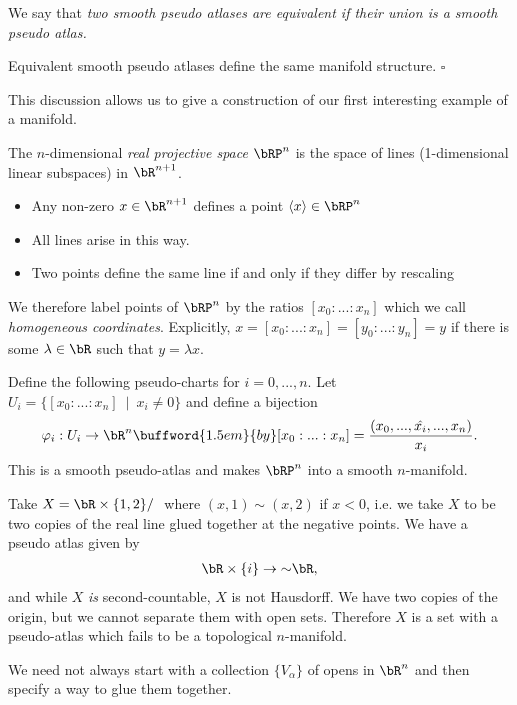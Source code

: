 We say that \emph{two smooth pseudo atlases are equivalent if their union is a smooth pseudo atlas.}
\begin{lem}\label{lem:equiv-pseudo-atlases}
	Equivalent smooth pseudo atlases define the same manifold structure. \hfill $\square$
\end{lem}
This discussion allows us to give a construction of our first interesting example of a manifold.
\begin{example}\label{expl:proj-space}
	The $n$-dimensional \emph{real projective space} $\bRP^n$ is the space of lines (1-dimensional linear subspaces) in $\bR^{n+1}$.
	\begin{itemize}
		\item Any non-zero $x \in \bR^{n+1}$ defines a point $\langle x \rangle \in \bRP^n$
		\item All lines arise in this way.
		\item Two points define the same line if and only if they differ by rescaling
	\end{itemize}
	We therefore label points of $\bRP^n$ by the ratios $[x_0:...:x_n]$ which we call \emph{homogeneous coordinates}. Explicitly, $x = [x_0:...:x_n] = [y_0:...:y_n] = y$ if there is some $\lambda \in \bR$ such that $y = \lambda x$.
\end{example}
Define the following pseudo-charts for $i = 0,...,n$. Let $U_i = \{[x_0:...:x_n] ~\mid~ x_i \neq 0\}$ and define a bijection
\begin{align*}
	\varphi_i:U_i \to \bR^n \buffword{1.5em}{by} [x_0:...:x_n] = \frac{(x_0,...,\hat{x_i},...,x_n)}{x_i}.
\end{align*}
This is a smooth pseudo-atlas and makes $\bRP^n$ into a smooth $n$-manifold.

\begin{example}\label{expl:pseudo-atlas-not-second-countable}
	Take $X = \bR \times \{1,2\} / ~$ where $(x,1) \sim (x,2)$ if $x < 0$, i.e. we take $X$ to be two copies of the real line glued together at the negative points. We have a pseudo atlas given by
	\begin{align*}
		\bR\times \{i\} \to{\sim} \bR,
	\end{align*}
	and while $X$ \emph{is} second-countable, $X$ is not Hausdorff. We have two copies of the origin, but we cannot separate them with open sets. Therefore $X$ is a set with a pseudo-atlas which fails to be a topological $n$-manifold.
\end{example}

\begin{rmk}\label{rmk:pseudo-atlas-constructions-alt-approach}
	We need not always start with a collection $\{V_\alpha\}$ of opens in $\bR^n$ and then specify a way to glue them together.
\end{rmk}



